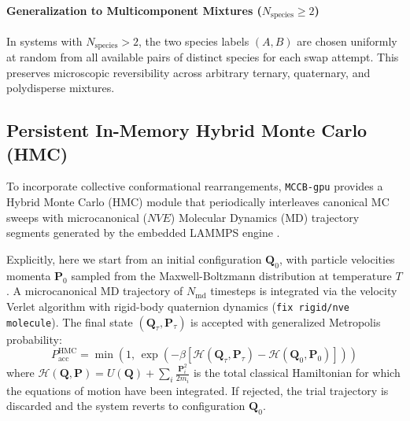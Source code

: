 \documentclass[final,5p,times,twocolumn]{elsarticle}
\begin{document}
\paragraph{Generalization to Multicomponent Mixtures ($N_{\text{species}} \ge 2$)}
In systems with $N_{\text{species}} > 2$, the two species labels $(A,
B)$ are chosen uniformly at random from all available pairs of
distinct species for each swap attempt. This preserves microscopic
reversibility across arbitrary ternary, quaternary, and polydisperse
mixtures. 

\subsection{Persistent In-Memory Hybrid Monte Carlo (HMC)}
\label{sec:algo_hmc}

To incorporate collective conformational rearrangements,
\texttt{MCCB-gpu} provides a Hybrid Monte Carlo (HMC) module
\cite{duane1987hybrid,mehlig1992hybrid} that periodically interleaves
canonical MC sweeps with microcanonical ($NVE$) Molecular Dynamics
(MD) trajectory segments generated by the embedded LAMMPS engine
\cite{thompson2022lammps}.

Explicitly, here we start from an initial configuration  $\mathbf{Q}_0$,
with particle velocities momenta $\mathbf{P}_0$ sampled
from 
the Maxwell-Boltzmann distribution at temperature $T$. A
microcanonical MD trajectory of $N_{\text{md}}$ timesteps is
integrated via the velocity Verlet algorithm with
rigid-body quaternion dynamics (\texttt{fix rigid/nve molecule}). The final state $(\mathbf{Q}_\tau, \mathbf{P}_\tau)$
is accepted with generalized
Metropolis probability: 
\begin{equation}
     P_{\text{acc}}^{\text{HMC}} = \min\left(1, \, \exp\left(-\beta [\mathcal{H}(\mathbf{Q}_\tau, \mathbf{P}_\tau) - \mathcal{H}(\mathbf{Q}_0, \mathbf{P}_0)]\right)\right) 
\end{equation}
where  $\mathcal{H}(\mathbf{Q}, \mathbf{P}) = U(\mathbf{Q}) + \sum_i
\frac{\mathbf{P}_i^2}{2m_i}$
is the total classical Hamiltonian for
which the equations of motion have been integrated. If
rejected, the trial trajectory is discarded and the system reverts to
configuration  $\mathbf{Q}_0$.
\end{document}
